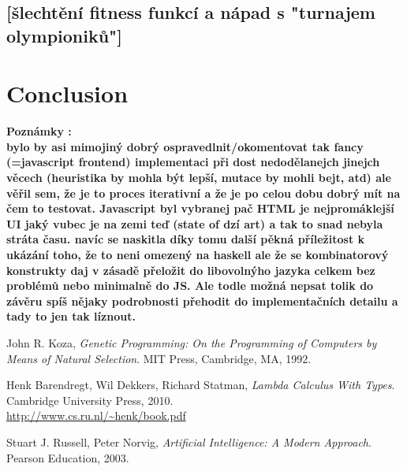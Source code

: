 \documentclass[12pt,a4paper]{report}
\begin{document}
\section{[šlechtění fitness funkcí a nápad s "turnajem olympioniků"]}




\chapter*{Conclusion}

\textbf{Poznámky :\\
bylo by asi mimojiný dobrý 
ospravedlnit/okomentovat tak fancy (=javascript frontend) 
implementaci při 
dost nedodělanejch jinejch věcech (heuristika by 
mohla být lepší, mutace by mohli bejt, atd)
ale věřil sem, že je to proces iterativní
a že je po celou dobu dobrý mít na čem to testovat.
Javascript byl vybranej pač HTML je nejpromáklejší
UI jaký vubec je na zemi teď (state of dzí art)
a tak to snad nebyla stráta času.
navíc se naskitla díky tomu další pěkná příležitost
k ukázání toho, že to neni omezený na haskell
ale že se kombinatorový konstrukty daj v zásadě přeložit do libovolnýho jazyka celkem bez problémů
nebo minimalně do JS. Ale todle možná nepsat tolik do závěru
spíš nějaky podrobnosti přehodit do implementačních detailu
a tady to jen tak líznout.}



	

\begin{thebibliography}{9}



  John R. Koza,
  \emph{Genetic Programming: On the Programming of Computers by Means of Natural Selection}.
  MIT Press, Cambridge, MA,
  1992. 


  Henk Barendregt, Wil Dekkers, Richard Statman,
  \emph{Lambda Calculus With Types}.
  Cambridge University Press,
  2010. \\
  \url{http://www.cs.ru.nl/~henk/book.pdf}



	Stuart J. Russell, Peter Norvig,
	\emph{Artificial Intelligence: A Modern Approach}.
	Pearson Education,
	2003. 

\end{thebibliography}

	
	
\end{document}
